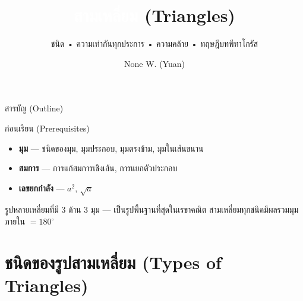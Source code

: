 \documentclass[11pt, aspectratio=169]{beamer}
\title[สามเหลี่ยม]{\textcolor{white}{สามเหลี่ยม} \textcolor{boxBlue!60}{(Triangles)}}
\subtitle{ชนิด • ความเท่ากันทุกประการ • ความคล้าย • ทฤษฎีบทพีทาโกรัส }
\author[None W. (Yuan)]{None W. (Yuan)}
\date{}
\begin{document}
\begin{frame}[plain]\titlepage\end{frame}
\begin{frame}{สารบัญ (Outline)}\tableofcontents\end{frame}

\begin{frame}{ก่อนเรียน (Prerequisites)}
  \begin{explanation}
    \begin{itemize}
      \item \textbf{มุม} — ชนิดของมุม, มุมประกอบ, มุมตรงข้าม, มุมในเส้นขนาน
      \item \textbf{สมการ} — การแก้สมการเชิงเส้น, การแยกตัวประกอบ
      \item \textbf{เลขยกกำลัง} — $a^2$, $\sqrt{a}$
    \end{itemize}
  \end{explanation}
  \begin{intuition}
    รูปหลายเหลี่ยมที่มี 3 ด้าน 3 มุม — เป็นรูปพื้นฐานที่สุดในเรขาคณิต
    สามเหลี่ยมทุกชนิดมีผลรวมมุมภายใน $= 180^\circ$
  \end{intuition}
\end{frame}

\section{ชนิดของรูปสามเหลี่ยม (Types of Triangles)}
\end{document}
